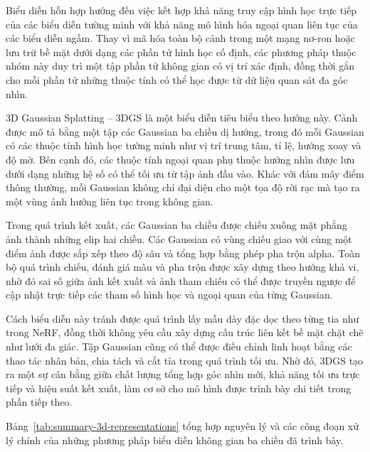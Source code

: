 Biểu diễn hỗn hợp hướng đến việc kết hợp khả năng truy cập hình học trực tiếp của các biểu diễn tường minh với khả năng mô hình hóa ngoại quan liên tục của các biểu diễn ngầm. Thay vì mã hóa toàn bộ cảnh trong một mạng nơ-ron hoặc lưu trữ bề mặt dưới dạng các phần tử hình học cố định, các phương pháp thuộc nhóm này duy trì một tập phần tử không gian có vị trí xác định, đồng thời gắn cho mỗi phần tử những thuộc tính có thể học được từ dữ liệu quan sát đa góc nhìn.

3D Gaussian Splatting -- 3DGS là một biểu diễn tiêu biểu theo hướng này. Cảnh được mô tả bằng một tập các Gaussian ba chiều dị hướng, trong đó mỗi Gaussian có các thuộc tính hình học tường minh như vị trí trung tâm, tỉ lệ, hướng xoay và độ mờ. Bên cạnh đó, các thuộc tính ngoại quan phụ thuộc hướng nhìn được lưu dưới dạng những hệ số có thể tối ưu từ tập ảnh đầu vào. Khác với đám mây điểm thông thường, mỗi Gaussian không chỉ đại diện cho một tọa độ rời rạc mà tạo ra một vùng ảnh hưởng liên tục trong không gian.

Trong quá trình kết xuất, các Gaussian ba chiều được chiếu xuống mặt phẳng ảnh thành những elip hai chiều. Các Gaussian có vùng chiếu giao với cùng một điểm ảnh được sắp xếp theo độ sâu và tổng hợp bằng phép pha trộn alpha. Toàn bộ quá trình chiếu, đánh giá màu và pha trộn được xây dựng theo hướng khả vi, nhờ đó sai số giữa ảnh kết xuất và ảnh tham chiếu có thể được truyền ngược để cập nhật trực tiếp các tham số hình học và ngoại quan của từng Gaussian.

Cách biểu diễn này tránh được quá trình lấy mẫu dày đặc dọc theo từng tia như trong NeRF, đồng thời không yêu cầu xây dựng cấu trúc liên kết bề mặt chặt chẽ như lưới đa giác. Tập Gaussian cũng có thể được điều chỉnh linh hoạt bằng các thao tác nhân bản, chia tách và cắt tỉa trong quá trình tối ưu. Nhờ đó, 3DGS tạo ra một sự cân bằng giữa chất lượng tổng hợp góc nhìn mới, khả năng tối ưu trực tiếp và hiệu suất kết xuất, làm cơ sở cho mô hình được trình bày chi tiết trong phần tiếp theo.

Bảng~\ref{tab:summary-3d-representations} tổng hợp nguyên lý và các công đoạn xử lý chính của những phương pháp biểu diễn không gian ba chiều đã trình bày.

\begingroup
\small
\renewcommand{\arraystretch}{1.25}
\setlength{\tabcolsep}{4pt}

